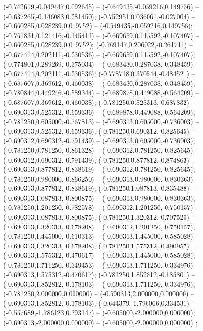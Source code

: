  (-0.742619,-0.049447,0.092645) -- (-0.649435,-0.059216,0.149756) -- (-0.637265,-0.146083,0.281450);
 (-0.752951,0.036061,-0.027004) -- (-0.660285,0.028239,0.019752) -- (-0.649435,-0.059216,0.149756);
 (-0.761831,0.121416,-0.145411) -- (-0.669659,0.115592,-0.107407) -- (-0.660285,0.028239,0.019752);
 (-0.769147,0.206022,-0.261711) -- (-0.677414,0.202111,-0.230536) -- (-0.669659,0.115592,-0.107407);
 (-0.774801,0.289269,-0.375034) -- (-0.683430,0.287038,-0.348459) -- (-0.677414,0.202111,-0.230536);
 (-0.778718,0.370544,-0.484521) -- (-0.687607,0.369612,-0.460038) -- (-0.683430,0.287038,-0.348459);
 (-0.780844,0.449246,-0.589344) -- (-0.689878,0.449088,-0.564209) -- (-0.687607,0.369612,-0.460038);
 (-0.781250,0.525313,-0.687832) -- (-0.690313,0.525312,-0.659336) -- (-0.689878,0.449088,-0.564209);
 (-0.781250,0.605000,-0.767813) -- (-0.690313,0.605000,-0.736003) -- (-0.690313,0.525312,-0.659336);
 (-0.781250,0.690312,-0.825645) -- (-0.690312,0.690312,-0.791439) -- (-0.690313,0.605000,-0.736003);
 (-0.781250,0.781250,-0.861328) -- (-0.690312,0.781250,-0.825645) -- (-0.690312,0.690312,-0.791439);
 (-0.781250,0.877812,-0.874863) -- (-0.690313,0.877812,-0.838619) -- (-0.690312,0.781250,-0.825645);
 (-0.781250,0.980000,-0.866250) -- (-0.690313,0.980000,-0.830363) -- (-0.690313,0.877812,-0.838619);
 (-0.781250,1.087813,-0.835488) -- (-0.690313,1.087813,-0.800875) -- (-0.690313,0.980000,-0.830363);
 (-0.781250,1.201250,-0.782578) -- (-0.690312,1.201250,-0.750157) -- (-0.690313,1.087813,-0.800875);
 (-0.781250,1.320312,-0.707520) -- (-0.690313,1.320313,-0.678208) -- (-0.690312,1.201250,-0.750157);
 (-0.781250,1.445000,-0.610313) -- (-0.690313,1.445000,-0.585028) -- (-0.690313,1.320313,-0.678208);
 (-0.781250,1.575312,-0.490957) -- (-0.690313,1.575312,-0.470617) -- (-0.690313,1.445000,-0.585028);
 (-0.781250,1.711250,-0.349453) -- (-0.690313,1.711250,-0.334976) -- (-0.690313,1.575312,-0.470617);
 (-0.781250,1.852812,-0.185801) -- (-0.690313,1.852812,-0.178103) -- (-0.690313,1.711250,-0.334976);
 (-0.781250,2.000000,0.000000) -- (-0.690313,2.000000,0.000000) -- (-0.690313,1.852812,-0.178103);
 (-0.644379,-1.796066,0.334531) -- (-0.557689,-1.786123,0.393147) -- (-0.605000,-2.000000,0.000000);
 (-0.690313,-2.000000,0.000000) -- (-0.605000,-2.000000,0.000000) ;
